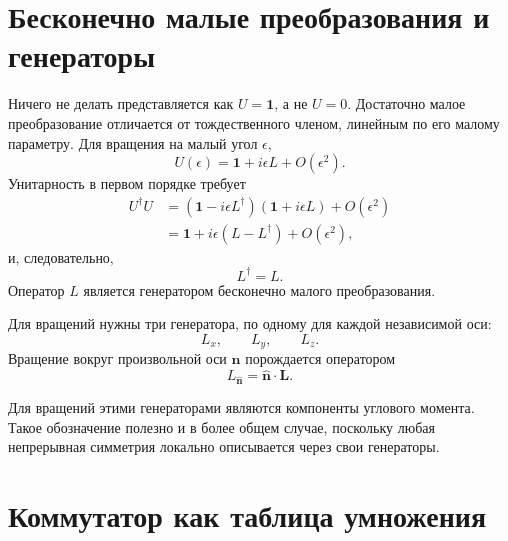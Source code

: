 \section{Бесконечно малые преобразования и генераторы}

Ничего не делать представляется как \(U=\mathbf 1\), а не \(U=0\). Достаточно малое преобразование отличается от тождественного членом, линейным по его малому параметру. Для вращения на малый угол \(\epsilon\),
\begin{equation}
U(\epsilon)=\mathbf 1+i\epsilon L+O(\epsilon^2).
\end{equation}
Унитарность в первом порядке требует
\begin{align}
U^\dagger U
&=\left(\mathbf 1-i\epsilon L^\dagger\right)
  \left(\mathbf 1+i\epsilon L\right)+O(\epsilon^2)\\
&=\mathbf 1+i\epsilon(L-L^\dagger)+O(\epsilon^2),
\end{align}
и, следовательно,
\begin{equation}
L^\dagger=L.
\end{equation}
Оператор \(L\) является генератором бесконечно малого преобразования.

Для вращений нужны три генератора, по одному для каждой независимой оси:
\begin{equation}
L_x,\qquad L_y,\qquad L_z.
\end{equation}
Вращение вокруг произвольной оси \(\widehat{\bm n}\) порождается оператором
\begin{equation}
L_{\widehat{\bm n}}=\widehat{\bm n}\cdot\bm L.
\end{equation}

\begin{classroomqa}
\end{classroomqa}

Для вращений этими генераторами являются компоненты углового момента. Такое обозначение полезно и в более общем случае, поскольку любая непрерывная симметрия локально описывается через свои генераторы.

\section{Коммутатор как таблица умножения}

